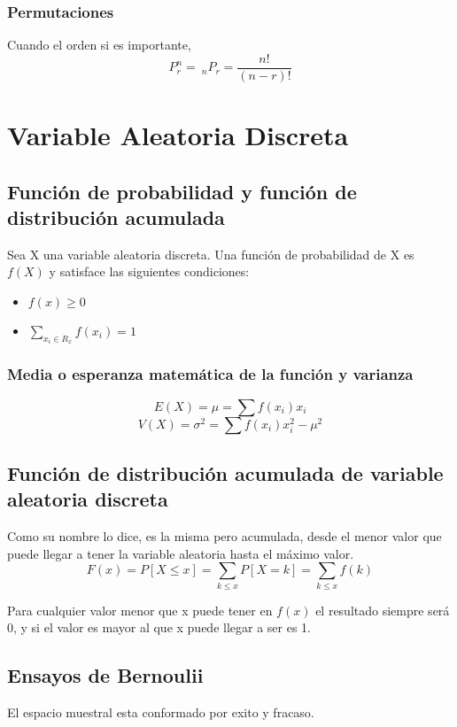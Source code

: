 \documentclass{article}
\begin{document}
\subsubsection*{Permutaciones}
Cuando el orden si es importante, \\
\[ P^{n}_{r}=\ _{n}P_{r}=\frac{n!}{(n-r)!} \]

\section{Variable Aleatoria Discreta} 
\subsection{Función de probabilidad y función de distribución acumulada}
Sea X una variable aleatoria discreta. Una función de probabilidad de X es $f(X)$ y satisface las siguientes condiciones:

\begin{itemize}
    \item $f(x)\geq0$
    \item $\sum_{x_{i}\in R_{x}} f(x_{i})=1$
\end{itemize}

\subsubsection{Media o esperanza matemática de la función y varianza}
\[
    E(X) = \mu = \sum f(x_{i})x_{i}
\]
\[
    V(X) = \sigma^{2} = \sum f(x_{i}) x_{i}^{2} - \mu^{2}
\]

\subsection{Función de distribución acumulada de variable aleatoria discreta}
Como su nombre lo dice, es la misma pero acumulada, desde el menor valor que puede llegar a tener la variable aleatoria hasta el máximo valor.\\

\[
    F(x) = P[X\leq x]=\sum_{k\leq x}P[X = k] = \sum_{k\leq x}f(k)
\]

Para cualquier valor menor que x puede tener en $f(x)$ el resultado siempre será 0, y si el valor es mayor al que x puede llegar a ser es 1.\\

\subsection{Ensayos de Bernoulii}
El espacio muestral esta conformado por exito y fracaso.
\end{document}
